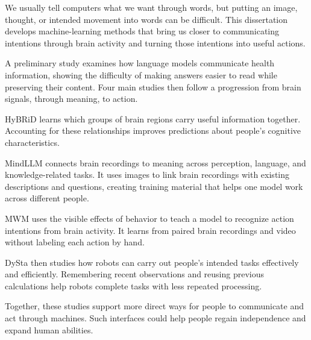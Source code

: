 \begin{laysummary}

We usually tell computers what we want through words, but putting an image, thought, or intended movement into words can be difficult. This dissertation develops machine-learning methods that bring us closer to communicating intentions through brain activity and turning those intentions into useful actions.

A preliminary study examines how language models communicate health information, showing the difficulty of making answers easier to read while preserving their content. Four main studies then follow a progression from brain signals, through meaning, to action.

HyBRiD learns which groups of brain regions carry useful information together. Accounting for these relationships improves predictions about people's cognitive characteristics.

MindLLM connects brain recordings to meaning across perception, language, and knowledge-related tasks. It uses images to link brain recordings with existing descriptions and questions, creating training material that helps one model work across different people.

MWM uses the visible effects of behavior to teach a model to recognize action intentions from brain activity. It learns from paired brain recordings and video without labeling each action by hand.

DySta then studies how robots can carry out people's intended tasks effectively and efficiently. Remembering recent observations and reusing previous calculations help robots complete tasks with less repeated processing.

Together, these studies support more direct ways for people to communicate and act through machines. Such interfaces could help people regain independence and expand human abilities.

\end{laysummary}
